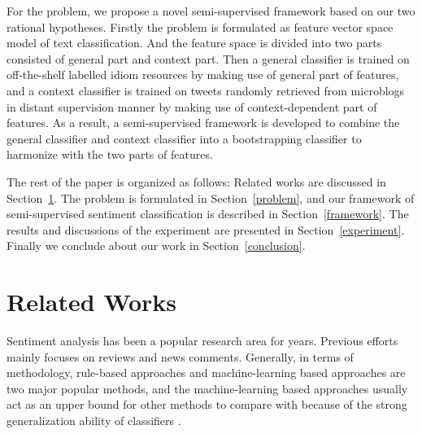 \documentclass{llncs}
\begin{document}
For the problem, we propose a novel semi-supervised framework based on our two rational hypotheses.
Firstly the problem is formulated as feature vector space model of text classification. 
And the feature space is divided into two parts consisted of general part and context part.   
Then a general classifier is trained on off-the-shelf labelled idiom resources by making use of general part of features, and a context classifier is trained on tweets randomly retrieved from microblogs in distant supervision manner by making use of context-dependent part of features. 
As a result, a semi-supervised framework is developed to combine the general classifier and context classifier into a bootstrapping classifier to harmonize with the two parts of features. 

The rest of the paper is organized as follows: Related works are discussed in Section~\ref{related}. The problem is formulated in Section~\ref{problem}, and our framework of semi-supervised sentiment classification is described in Section~\ref{framework}. The results and discussions of the experiment are presented in Section~\ref{experiment}. Finally we conclude about our work in Section~\ref{conclusion}.

\section{Related Works}
\label{related}

Sentiment analysis has been a popular research area for years. 
Previous efforts mainly focuses on reviews and news comments. 
Generally, in terms of methodology, rule-based approaches and machine-learning based approaches are two major popular methods, and the machine-learning based approaches usually act as an upper bound for other methods to compare with because of the strong generalization ability of classifiers \cite{xsongx:b1,xsongx:b4}. 
\end{document}
